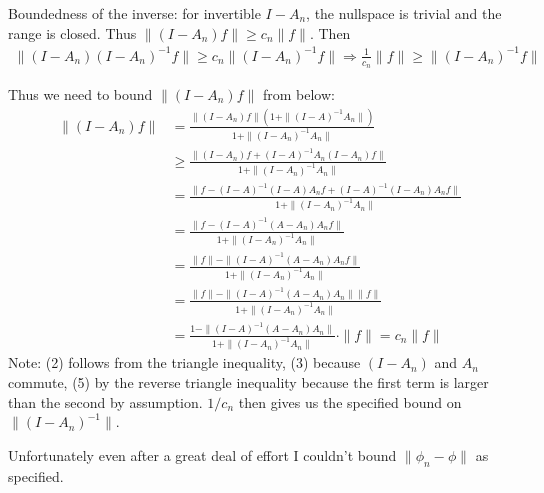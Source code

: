 \documentclass[12pt]{article}
\begin{document}
Boundedness of the inverse: for invertible $I-A_n$, the nullspace is trivial and
the range is closed. Thus $\|(I-A_n)f\| \geq c_n\|f\|$. Then
\begin{align*}
  \|(I-A_n)(I-A_n)^{-1}f\| \geq c_n\|(I-A_n)^{-1}f\| \Rightarrow
  \frac{1}{c_n}\|f\| \geq \|(I-A_n)^{-1}f\|
\end{align*}

Thus we need to bound $\|(I-A_n)f\|$ from below:
\begin{align}
  \|(I-A_n)f\|
  &= \frac{\|(I-A_n)f\|(1+\|(I-A)^{-1}A_n\|)}{1+\|(I-A_n)^{-1}A_n\|}\\
  &\geq \frac{\|(I-A_n)f + (I-A)^{-1}A_n(I-A_n)f\|}{1+\|(I-A_n)^{-1}A_n\|}\\
  &= \frac{\|f-(I-A)^{-1}(I-A)A_nf+(I-A)^{-1}(I-A_n)A_nf\|}{1+\|(I-A_n)^{-1}
    A_n\|}\\ %
  &= \frac{\|f - (I-A)^{-1}(A-A_n)A_nf\|}{1+\|(I-A_n)^{-1}A_n\|}\\
  &= \frac{\|f\|-\|(I-A)^{-1}(A-A_n)A_nf\|}{1+\|(I-A_n)^{-1}A_n\|}\\
  &= \frac{\|f\|-\|(I-A)^{-1}(A-A_n)A_n\|\|f\|}{1+\|(I-A_n)^{-1}A_n\|}\\
  &= \frac{1-\|(I-A)^{-1}(A-A_n)A_n\|}{1+\|(I-A_n)^{-1}A_n\|}\cdot \|f\| =
    c_n\|f\|
\end{align}
Note: (2) follows from the triangle inequality, (3) because $(I-A_n)$ and $A_n$
commute, (5) by the reverse triangle inequality because the first term is larger
than the second by assumption. $1/c_n$ then gives us the specified bound on
$\|(I-A_n)^{-1}\|$.

Unfortunately even after a great deal of effort I couldn't bound
$\|\phi_n-\phi\|$ as specified.
\end{document}
